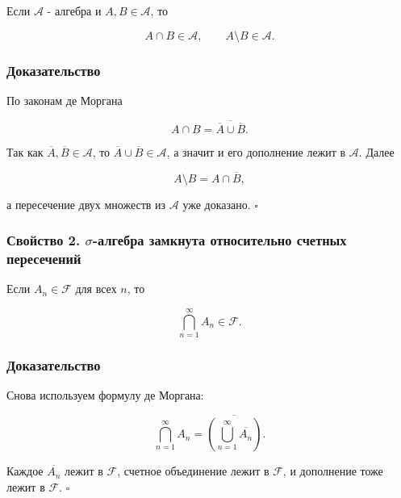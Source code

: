 \documentclass[
  11pt,
  a4paper,
]{article}
\begin{document}
Если \(\mathcal A\) - алгебра и \(A,B\in\mathcal A\), то

\[
A\cap B\in\mathcal A,\qquad A\setminus B\in\mathcal A.
\]

\subsubsection{Доказательство}\label{ux434ux43eux43aux430ux437ux430ux442ux435ux43bux44cux441ux442ux432ux43e}

По законам де Моргана

\[
A\cap B=\overline{\overline{A}\cup \overline{B}}.
\]

Так как \(\overline{A},\overline{B}\in\mathcal A\), то
\(\overline{A}\cup \overline{B}\in\mathcal A\), а значит и его
дополнение лежит в \(\mathcal A\). Далее

\[
A\setminus B=A\cap \overline{B},
\]

а пересечение двух множеств из \(\mathcal A\) уже доказано. \(\square\)

\subsubsection{\texorpdfstring{Свойство 2. \(\sigma\)-алгебра замкнута
относительно счетных
пересечений}{Свойство 2. \textbackslash sigma-алгебра замкнута относительно счетных пересечений}}\label{ux441ux432ux43eux439ux441ux442ux432ux43e-2.-sigma-ux430ux43bux433ux435ux431ux440ux430-ux437ux430ux43cux43aux43dux443ux442ux430-ux43eux442ux43dux43eux441ux438ux442ux435ux43bux44cux43dux43e-ux441ux447ux435ux442ux43dux44bux445-ux43fux435ux440ux435ux441ux435ux447ux435ux43dux438ux439}

Если \(A_n\in\mathcal F\) для всех \(n\), то

\[
\bigcap_{n=1}^{\infty}A_n\in\mathcal F.
\]

\subsubsection{Доказательство}\label{ux434ux43eux43aux430ux437ux430ux442ux435ux43bux44cux441ux442ux432ux43e-1}

Снова используем формулу де Моргана:

\[
\bigcap_{n=1}^{\infty}A_n=\overline{\left(\bigcup_{n=1}^{\infty}\overline{A_n}\right)}.
\]

Каждое \(\overline{A_n}\) лежит в \(\mathcal F\), счетное объединение
лежит в \(\mathcal F\), и дополнение тоже лежит в \(\mathcal F\).
\(\square\)
\end{document}
